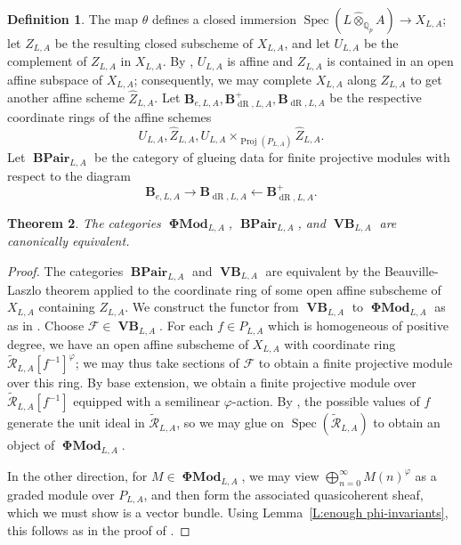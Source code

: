\documentclass[12pt]{amsart}
\newtheorem{theorem}{Theorem}[section]
\theoremstyle{definition}
\newtheorem{defn}[theorem]{Definition}
\numberwithin{equation}{theorem}
\newcommand{\bB}{\mathbf{B}}
\newcommand{\QQ}{\mathbb{Q}}
\newcommand{\calF}{\mathcal{F}}
\newcommand{\calR}{\mathcal{R}}
\DeclareMathOperator{\BPair}{\mathbf{BPair}}
\DeclareMathOperator{\dR}{dR}
\DeclareMathOperator{\PhiMod}{\mathbf{\Phi Mod}}
\DeclareMathOperator{\Proj}{Proj}
\DeclareMathOperator{\Spec}{Spec}
\DeclareMathOperator{\VB}{\mathbf{VB}}
\begin{document}
\begin{defn}
The map $\theta$ defines a closed immersion $\Spec(L \widehat{\otimes}_{\QQ_p} A) \to X_{L,A}$; let $Z_{L,A}$ be the resulting closed subscheme of $X_{L,A}$, and let $U_{L,A}$ be the complement of $Z_{L,A}$ in $X_{L,A}$.
By \cite[Lemma~8.9.3]{kedlaya-liu1}, $U_{L,A}$ is affine and $Z_{L,A}$ is contained in an open affine subspace of $X_{L,A}$; consequently, we may complete $X_{L,A}$ along $Z_{L,A}$ to get another affine scheme $\widehat{Z}_{L,A}$. Let $\bB_{e,L,A}, \bB^+_{\dR,L,A}, \bB_{\dR,L,A}$ be the respective coordinate rings of the affine schemes 
\[
U_{L,A}, \widehat{Z}_{L,A}, U_{L,A} \times_{\Proj(P_{L,A})} \widehat{Z}_{L,A}.
\]
Let $\BPair_{L,A}$ be the category of glueing data for finite projective modules with respect to the diagram
\[
\bB_{e,L,A} \rightarrow \bB_{\dR,L,A} \leftarrow \bB_{\dR,L,A}^+.
\]
\end{defn}

\begin{theorem} \label{T:perfect equivalence}
The categories $\PhiMod_{L,A}$, $\BPair_{L,A}$, and $\VB_{L,A}$ are canonically equivalent.
\end{theorem}
\begin{proof}
The categories $\BPair_{L,A}$ and $\VB_{L,A}$ are equivalent by the Beauville-Laszlo theorem
\cite{beauville-laszlo} applied to the coordinate ring of some open affine subscheme of $X_{L,A}$ containing $Z_{L,A}$.
We construct the functor from $\VB_{L,A}$ to $\PhiMod_{L,A}$ as 
as in \cite[Definition~6.3.10]{kedlaya-liu1}.
Choose $\calF \in \VB_{L,A}$.
For each $f \in P_{L,A}$ which is homogeneous of positive degree,
we have an open affine subscheme of $X_{L,A}$ with coordinate ring $\tilde{\calR}_{L,A}[f^{-1}]^\varphi$; we may thus take sections of $\calF$ to obtain a finite projective module over  this ring. By base extension, we obtain a finite projective module over $\tilde{\calR}_{L,A}[f^{-1}]$ equipped with a semilinear $\varphi$-action. By \cite[Lemma~6.3.7]{kedlaya-liu1}, the possible values of $f$ generate the unit ideal in $\tilde{\calR}_{L,A}$, so we may glue on $\Spec(\tilde{\calR}_{L,A})$ to obtain an object of $\PhiMod_{L,A}$.

In the other direction, for $M \in \PhiMod_{L,A}$, we may view
$\bigoplus_{n=0}^\infty M(n)^{\varphi}$ as a graded module over $P_{L,A}$, and then form the associated quasicoherent sheaf, which we must show is a vector bundle.
Using Lemma~\ref{L:enough phi-invariants}, this follows as in the proof of \cite[Theorem~6.3.12]{kedlaya-liu1}.
\end{proof}
\end{document}
